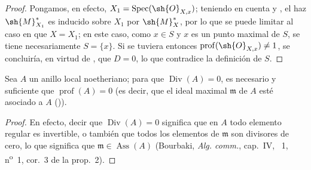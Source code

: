 \begin{proof}
Pongamos, en efecto, $X_1=\operatorname{Spec}(\sh{O}_{X,x})$;
teniendo en cuenta  y , el haz $\sh{M}_{X_1}^*$ es inducido sobre $X_1$ por $\sh{M}_X^*$, por lo que se puede limitar al caso en que $X=X_1$; en este caso, como $x\in S$ y $x$ es un punto maximal de $S$, se tiene necesariamente $S=\{x\}$.
Si se tuviera entonces $\operatorname{prof}(\sh{O}_{X,x})\neq1$, se concluiría, en virtud de , que $D=0$, lo que contradice la definición de $S$.
\end{proof}

\begin{proposition}[21.1.10]
\label{IV.21.1.10}
Sea $A$ un anillo local noetheriano;
para que $\operatorname{Div}(A)=0$, es necesario y suficiente que $\operatorname{prof}(A)=0$ (es decir, que el ideal maximal $\mathfrak{m}$ de $A$ esté asociado a $A$ \textup{())}.
\end{proposition}

\begin{proof}
En efecto, decir que $\operatorname{Div}(A)=0$ significa que en $A$ todo elemento regular es invertible, o también que todos los elementos de $\mathfrak{m}$ son divisores de cero, lo que significa que $\mathfrak{m}\in\operatorname{Ass}(A)$ (Bourbaki, \emph{Alg. comm.}, cap.~IV, \textsection~1, n\textsuperscript{o}~1, cor.~3 de la prop.~2).
\end{proof}
